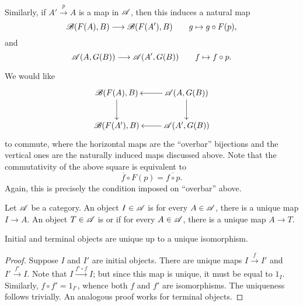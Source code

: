 Similarly, if $A'\xrightarrow{p} A$ is a map in $\mathscr A$, then this induces a natural map 
\begin{equation*}
    \mathscr B(F(A), B)\longrightarrow\mathscr B(F(A'), B)\qquad g\mapsto g\circ F(p),
\end{equation*}
and 
\begin{equation*}
    \mathscr A(A, G(B))\longrightarrow\mathscr A(A', G(B))\qquad f\mapsto f\circ p.
\end{equation*}

We would like 
\begin{equation*}
    \xymatrix {
        \scrB(F(A), B)\ar[d] & \scrA(A, G(B))\ar[l]\ar[d]\\
        \scrB(F(A'), B) & \scrA(A', G(B))\ar[l]
    }
\end{equation*}
to commute, where the horizontal maps are the ``overbar'' bijections and the vertical ones are the naturally induced maps discussed above. Note that the commutativity of the above square is equivalent to 
\begin{equation*}
    \overline f\circ F(p) = \overline{f\circ p}.
\end{equation*}
Again, this is precisely the condition imposed on ``overbar'' above.


\begin{definition}
    Let $\mathscr A$ be a category. An object $I\in\mathscr A$ is  for every $A\in\mathscr A$, there is a unique map $I\to A$. An object $T\in\mathscr A$ is  or  if for every $A\in\mathscr A$, there is a unique map $A\to T$.
\end{definition}

\begin{proposition}
    Initial and terminal objects are unique up to a unique isomorphism.
\end{proposition}
\begin{proof}
    Suppose $I$ and $I'$ are initial objects. There are unique maps $I\xrightarrow{f} I'$ and $I'\xrightarrow{f'} I$. Note that $I\xrightarrow{f'\circ f} I$; but since this map is unique, it must be equal to $1_I$. Similarly, $f\circ f' = 1_{I'}$, whence both $f$ and $f'$ are isomorphisms. The uniqueness follows trivially. An analogous proof works for terminal objects.
\end{proof}
